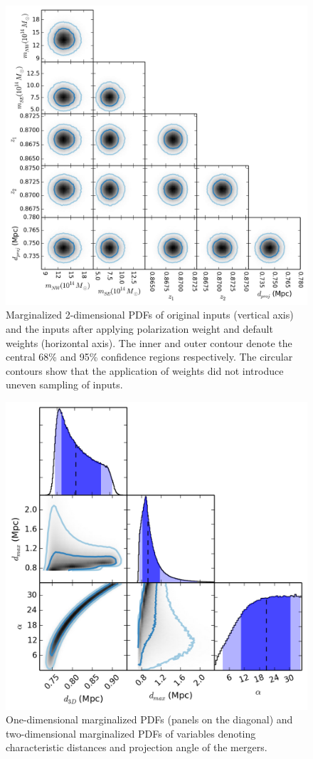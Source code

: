 \documentclass[letterpaper,useAMS,usenatbib]{mn2e}
\begin{document}
\begin{figure}
	\begin{minipage}{180mm}
	\begin{center}
	\includegraphics[width=0.65\linewidth]{TwoMnWBSG_inputsVsinput.png}
	\caption{Marginalized 2-dimensional PDFs of original inputs (vertical axis) and the inputs after
applying polarization weight and default weights (horizontal axis). The inner and outer contour
denote the central 68\% and 95\% confidence regions respectively.
The circular contours show that the application of weights did not introduce
uneven sampling of inputs. }
	\end{center}
	\end{minipage}
\end{figure}
\begin{figure}
\begin{minipage}{180mm}
	\begin{center}
	\includegraphics[width=0.5\linewidth]{TwoMnWBSG_tri_geo.png}
	\caption{One-dimensional marginalized PDFs (panels on the diagonal) and
		two-dimensional marginalized PDFs of variables
		denoting characteristic distances and projection angle of the mergers.
	\label{fig:geom_geom}
	}
	\end{center}
	\end{minipage}
\end{figure}
\end{document}

